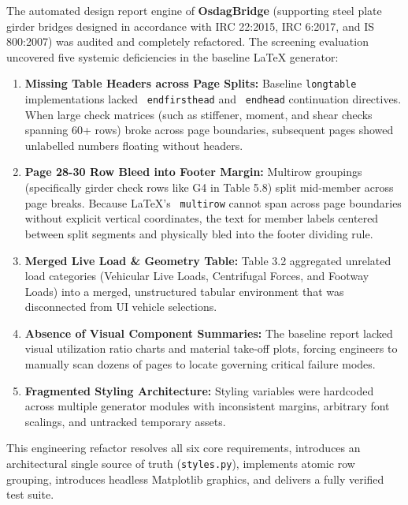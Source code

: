 \documentclass[12pt,a4paper]{article}
\begin{document}
The automated design report engine of \textbf{OsdagBridge} (supporting steel plate girder bridges designed in accordance with IRC 22:2015, IRC 6:2017, and IS 800:2007) was audited and completely refactored. The screening evaluation uncovered five systemic deficiencies in the baseline LaTeX generator:
\begin{enumerate}
  \item \textbf{Missing Table Headers across Page Splits:} Baseline \texttt{longtable} implementations lacked \texttt{ endfirsthead} and \texttt{ endhead} continuation directives. When large check matrices (such as stiffener, moment, and shear checks spanning 60+ rows) broke across page boundaries, subsequent pages showed unlabelled numbers floating without headers.
  \item \textbf{Page 28-30 Row Bleed into Footer Margin:} Multirow groupings (specifically girder check rows like G4 in Table 5.8) split mid-member across page breaks. Because LaTeX's \texttt{ multirow} cannot span across page boundaries without explicit vertical coordinates, the text for member labels centered between split segments and physically bled into the footer dividing rule.
  \item \textbf{Merged Live Load \& Geometry Table:} Table 3.2 aggregated unrelated load categories (Vehicular Live Loads, Centrifugal Forces, and Footway Loads) into a merged, unstructured tabular environment that was disconnected from UI vehicle selections.
  \item \textbf{Absence of Visual Component Summaries:} The baseline report lacked visual utilization ratio charts and material take-off plots, forcing engineers to manually scan dozens of pages to locate governing critical failure modes.
  \item \textbf{Fragmented Styling Architecture:} Styling variables were hardcoded across multiple generator modules with inconsistent margins, arbitrary font scalings, and untracked temporary assets.
\end{enumerate}

This engineering refactor resolves all six core requirements, introduces an architectural single source of truth (\nolinkurl{styles.py}), implements atomic row grouping, introduces headless Matplotlib graphics, and delivers a fully verified test suite.

\vspace{0.3cm}

\end{document}
